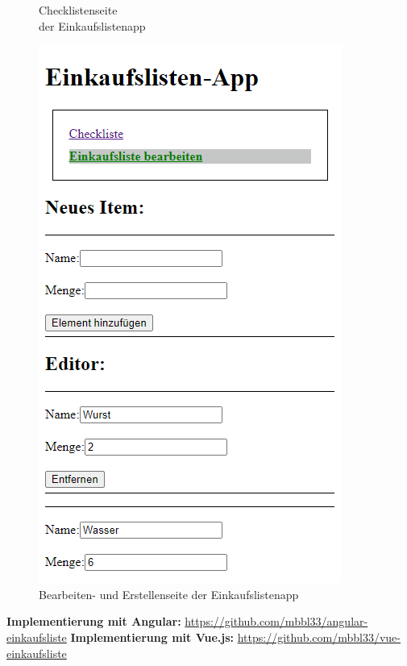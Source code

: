 \begin{figure}[h]
\begin{minipage}[H]{.45\textwidth}
        \caption{Checklistenseite\\ der Einkaufslistenapp}
        \label{fig:checklistenseite}
    \end{minipage}
    \hspace{.1\linewidth}%
    \begin{minipage}[H]{.45\textwidth}
        \includegraphics[width=\textwidth]{img/vue-Einkaufsliste-Editor}
        \caption{Bearbeiten- und Erstellenseite der Einkaufslistenapp}
        \label{fig:editlistenseite}
    \end{minipage}
\end{figure}

\textbf{Implementierung mit Angular:} \url{https://github.com/mbbl33/angular-einkaufsliste}
\textbf{Implementierung mit Vue.js:} \url{https://github.com/mbbl33/vue-einkaufsliste}
